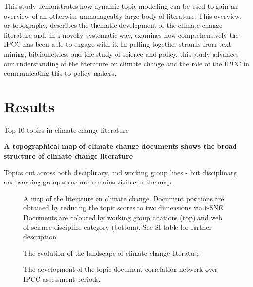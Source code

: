 \documentclass{article}
\begin{document}
\begin{linenumbers}
This study demonstrates how dynamic topic modelling can be used to gain an overview of an otherwise unmanageably large body of literature. This overview, or topography, describes the thematic development of the climate change literature and, in a novelly systematic way, examines how  comprehensively the IPCC has been able to engage with it. In pulling together strands from text-mining, bibliometrics, and the study of science and policy, this study advances our understanding of the literature on climate change and the role of the IPCC in communicating this to policy makers.


\section*{Results}

\begin{table}
	\scriptsize
	
	\caption{Top 10 topics in climate change literature}
\end{table}

\bigskip
\noindent\textbf{A topographical map of climate change documents shows the broad structure of climate change literature}

Topics cut across both disciplinary, and working group lines - but disciplinary and working group structure remains visible in the map.

\begin{figure}
	\begin{center}
		\caption{A map of the literature on climate change. Document positions are obtained by reducing the topic scores to two dimensions via t-SNE Documents are coloured by working group citations (top) and web of science discipline category (bottom). See SI table for further description}
		\label{}
	\end{center}
\end{figure}

\begin{figure}
	\begin{center}
		\caption{The evolution of the landscape of climate change literature}
		\label{}
	\end{center}
\end{figure}


\begin{figure}
	\begin{center}
		\caption{The development of the topic-document correlation network over IPCC assessment periods.}
		\label{}
	\end{center}
\end{figure}


\end{linenumbers}
\end{document}
